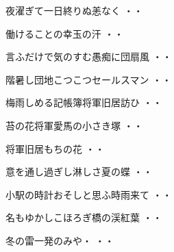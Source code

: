 \vspace{0.6cm}
\begin{shiika}夜濯ぎて一日終りぬ恙なく
\hfill{・・}\end{shiika}
\vspace{0.6cm}
\begin{shiika}働けることの幸玉の汗
\hfill{・・}\end{shiika}
\vspace{0.6cm}
\begin{shiika}言ふだけで気のすむ愚痴に団扇風
\hfill{・・}\end{shiika}
\vspace{0.6cm}
\begin{shiika}階暑し団地こつこつセールスマン
\hfill{・・}\end{shiika}
\vspace{0.6cm}
\begin{shiika}梅雨しめる記帳簿将軍旧居訪ひ
\hfill{・・}\end{shiika}
\vspace{0.6cm}
\begin{shiika}苔の花将軍愛馬の小さき塚
\hfill{・・}\end{shiika}
\vspace{0.6cm}
\begin{shiika}将軍旧居もちの花
\hfill{・・}\end{shiika}
\vspace{0.6cm}
\begin{shiika}意を通し過ぎし淋しさ夏の蝶
\hfill{・・}\end{shiika}
\vspace{0.6cm}
\begin{shiika}小駅の時計おそしと思ふ時雨来て
\hfill{・・}\end{shiika}
\vspace{0.6cm}
\begin{shiika}名もゆかしこほろぎ橋の渓紅葉
\hfill{・・}\end{shiika}
\vspace{0.6cm}
\begin{shiika}冬の雷一発のみや・
\hfill{・・}\end{shiika}
